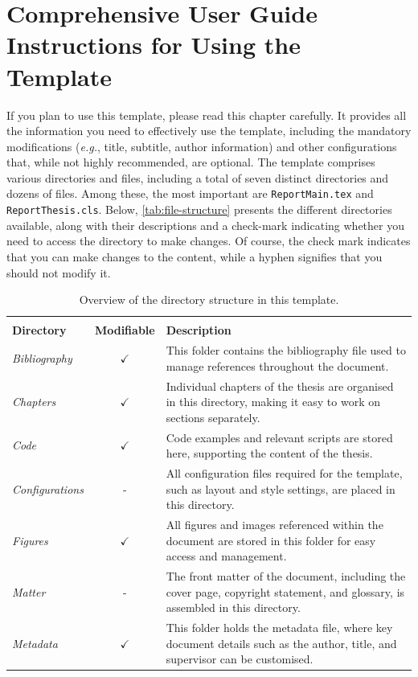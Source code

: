 \chapter[Comprehensive User Guide: Instructions for Using the Template]{Comprehensive User Guide Instructions for Using the Template}
\label{cp:user-guide}

If you plan to use this template, please read this chapter carefully. It provides all the information you need to effectively use the template, including the mandatory modifications (\textit{e.g.}, title, subtitle, author information) and other configurations that, while not highly recommended, are optional. The template comprises various directories and files, including a total of seven distinct directories and dozens of files. Among these, the most important are \texttt{ReportMain.tex} and \texttt{ReportThesis.cls}. Below, \autoref{tab:file-structure} presents the different directories available, along with their descriptions and a check-mark indicating whether you need to access the directory to make changes. Of course, the check mark indicates that you can make changes to the content, while a hyphen signifies that you should not modify it.

\begin{table}[!htpb]
    \setlength{\extrarowheight}{2pt}
    \caption[Directory structure and file organisation]{Overview of the directory structure in this template.}
    \label{tab:file-structure}
    \begin{tabularx}{\textwidth}{lcX}
        \toprule
        \\[-1.5\normalbaselineskip]
        \textbf{Directory} & \textbf{Modifiable} & \textbf{Description} \\ [0em]
        \midrule
        \textit{Bibliography} & $\checkmark$ & This folder contains the bibliography file used to manage references throughout the document. \\
        \textit{Chapters} & $\checkmark$ & Individual chapters of the thesis are organised in this directory, making it easy to work on sections separately. \\
        \textit{Code} & $\checkmark$ & Code examples and relevant scripts are stored here, supporting the content of the thesis. \\
        \textit{Configurations} & - & All configuration files required for the template, such as layout and style settings, are placed in this directory. \\
        \textit{Figures} & $\checkmark$ & All figures and images referenced within the document are stored in this folder for easy access and management. \\
        \textit{Matter} & - & The front matter of the document, including the cover page, copyright statement, and glossary, is assembled in this directory. \\
        \textit{Metadata} & $\checkmark$ & This folder holds the metadata file, where key document details such as the author, title, and supervisor can be customised. \\
        \bottomrule
    \end{tabularx}
\end{table}

